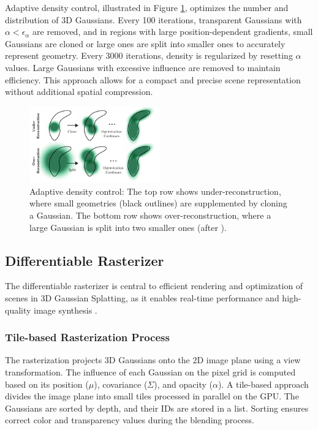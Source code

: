 Adaptive density control, illustrated in Figure \ref{fig:adaptivecontrol}, optimizes the number and distribution of 3D Gaussians.
Every 100 iterations, transparent Gaussians with \(\alpha < \epsilon_\alpha\) are removed, and in regions with large position-dependent gradients, small Gaussians are cloned or large ones are split into smaller ones to accurately represent geometry.
Every 3000 iterations, density is regularized by resetting \(\alpha\) values.
Large Gaussians with excessive influence are removed to maintain efficiency.
This approach allows for a compact and precise scene representation without additional spatial compression.

\begin{figure}[h]
\centering
\includegraphics[width=0.5\textwidth]{Grafiken/Fundamentals/density_control_01.pdf}
\caption{Adaptive density control: The top row shows under-reconstruction, where small geometries (black outlines) are supplemented by cloning a Gaussian. The bottom row shows over-reconstruction, where a large Gaussian is split into two smaller ones (after \cite{kerbl3Dgaussians}).}
\label{fig:adaptivecontrol}
\end{figure}


\subsection{Differentiable Rasterizer}

The differentiable rasterizer is central to efficient rendering and optimization of scenes in 3D Gaussian Splatting, as it enables real-time performance and high-quality image synthesis \cite{kerbl3Dgaussians}.

\subsubsection{Tile-based Rasterization Process}

The rasterization projects 3D Gaussians onto the 2D image plane using a view transformation.
The influence of each Gaussian on the pixel grid is computed based on its position (\(\mu\)), covariance (\(\Sigma\)), and opacity (\(\alpha\)).
A tile-based approach divides the image plane into small tiles processed in parallel on the GPU.
The Gaussians are sorted by depth, and their IDs are stored in a list.
Sorting ensures correct color and transparency values during the blending process.

